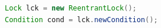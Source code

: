 \begin{lstlisting}[language=Java]
Lock lck = new ReentrantLock();
Condition cond = lck.newCondition();
\end{lstlisting}
